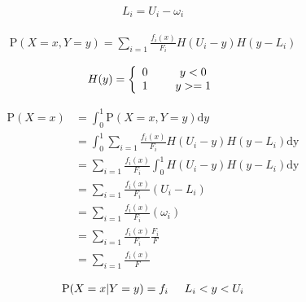 \documentclass{revtex4}
\begin{document}
  \begin{align}
    L_i = U_i - \omega_i 
  \end{align}

  \begin{align}
    \mathrm{P}(X=x, Y=y) = \sum_{i=1} \frac{f_i(x)}{F_i} H(U_i - y) H(y - L_i)
  \end{align}

  \begin{align}
    H(y) = 
    \left\{ \begin{array}{cc} 
    0 & \hspace{5mm} y<0 \\
    1 & \hspace{5mm} y>=1 \\
    \end{array} \right.
  \end{align}

  \begin{align}
    \mathrm{P}(X=x) &= \int_0^1 \mathrm{P}(X=x, Y=y) \mathrm{d}y \\
    &= \int_0^1 \sum_{i=1} \frac{f_i(x)}{F_i} H(U_i - y) H(y - L_i) \mathrm{dy} \\
    &= \sum_{i=1} \frac{f_i(x)}{F_i} \int_0^1 H(U_i - y) H(y - L_i) \mathrm{dy} \\
    &= \sum_{i=1} \frac{f_i(x)}{F_i} (U_i - L_i) \\
    &= \sum_{i=1} \frac{f_i(x)}{F_i} (\omega_i) \\
    &= \sum_{i=1} \frac{f_i(x)}{F_i} \frac{F_i}{F} \\
    &= \sum_{i=1} \frac{f_i(x)}{F}
  \end{align}

  \begin{align}
    \mathrm{P}(X=x|Y=y) = f_i \hspace{5mm} L_i < y < U_i
  \end{align}
\end{document}
